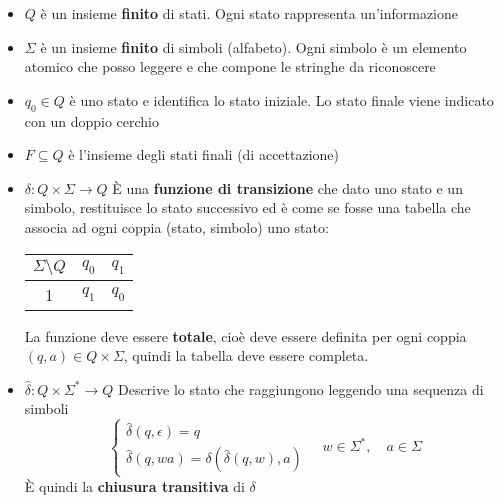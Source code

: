 \documentclass[a4paper]{article}
\begin{document}
\begin{itemize}
  \item \( Q \) è un insieme \textbf{finito} di stati. Ogni stato rappresenta
    un'informazione

  \item \( \Sigma  \) è un insieme \textbf{finito} di simboli (alfabeto).
    Ogni simbolo è un elemento atomico che posso leggere e che compone le
    stringhe da riconoscere
    
  \item \( q_0 \in Q \) è uno stato e identifica lo stato iniziale. Lo stato finale
    viene indicato con un doppio cerchio

  \item \( F \subseteq Q \) è l'insieme degli stati finali (di accettazione)

  \item \( \delta: Q \times \Sigma \to Q \) È una \textbf{funzione di transizione}
    che dato uno stato e un simbolo, restituisce lo stato successivo ed è come se
    fosse una tabella che associa ad ogni coppia (stato, simbolo) uno stato:
    \begin{table}[H]
      \centering
      \begin{tabular}{c|c|c}
        \( \Sigma \setminus Q\) & \( q_0 \) & \( q_1 \)\\
        \hline
        1 & \( q_1 \) & \( q_0 \)\\
      \end{tabular}
    \end{table}
    La funzione deve essere \textbf{totale}, cioè deve essere definita per ogni
    coppia \( (q,a) \in Q \times \Sigma  \), quindi la tabella deve essere completa.

  \item \( \hat{\delta}: Q \times \Sigma^* \to Q \) Descrive lo stato che raggiungono
    leggendo una sequenza di simboli
    \[
      \begin{cases}
        \hat{\delta}(q, \epsilon) = q\\
        \hat{\delta}(q, wa) = \delta(\hat{\delta}(q,w), a)
      \end{cases}
      \quad
      w \in \Sigma^*, \quad a \in \Sigma 
    \] 
    È quindi la \textbf{chiusura transitiva} di \( \delta \)
\end{itemize}
\end{document}
